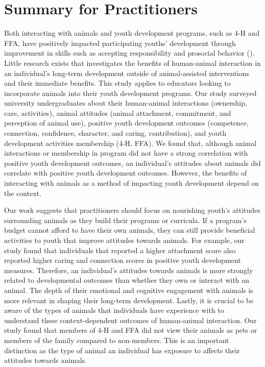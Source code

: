 \documentclass[
  jou,
  longtable,
  nolmodern,
  notxfonts,
  notimes,
  colorlinks=true,linkcolor=blue,citecolor=blue,urlcolor=blue]{apa7}
\begin{document}
\section{Summary for Practitioners}\label{summary-for-practitioners}

Both interacting with animals and youth development programs, such as
4-H and FFA, have positively impacted participating youths' development
through improvement in skills such as accepting responsibility and
prosocial behavior (). Little
research exists that investigates the benefits of human-animal
interaction in an individual's long-term development outside of
animal-assisted interventions and their immediate benefits. This study
applies to educators looking to incorporate animals into their youth
development programs. Our study surveyed university undergraduates about
their human-animal interactions (ownership, care, activities), animal
attitudes (animal attachment, commitment, and perception of animal use),
positive youth development outcomes (competence, connection, confidence,
character, and caring, contribution), and youth development activities
membership (4-H, FFA). We found that, although animal interactions or
membership in program did not have a strong correlation with positive
youth development outcomes, an individual's attitudes about animals did
correlate with positive youth development outcomes. However, the
benefits of interacting with animals as a method of impacting youth
development depend on the context.

Our work suggests that practitioners should focus on nourishing youth's
attitudes surrounding animals as they build their programs or curricula.
If a program's budget cannot afford to have their own animals, they can
still provide beneficial activities to youth that improve attitudes
towards animals. For example, our study found that individuals that
reported a higher attachment score also reported higher caring and
connection scores in positive youth development measures. Therefore, an
individual's attitudes towards animals is more strongly related to
developmental outcomes than whether they own or interact with an animal.
The depth of their emotional and cognitive engagement with animals is
more relevant in shaping their long-term development. Lastly, it is
crucial to be aware of the types of animals that individuals have
experience with to understand these context-dependent outcomes of
human-animal interaction. Our study found that members of 4-H and FFA
did not view their animals as pets or members of the family compared to
non-members. This is an important distinction as the type of animal an
individual has exposure to affects their attitudes towards animals.
\end{document}
